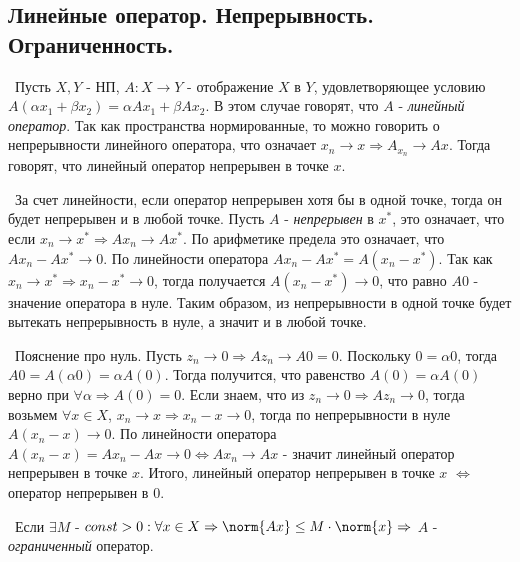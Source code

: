 \subsection*{Линейные оператор. Непрерывность. Ограниченность.}

\noindent\textasteriskcentered~Пусть $X, Y$ - НП, $A : X \rightarrow Y$ - отображение $X$ в $Y$, удовлетворяющее условию $A(\alpha x_1 + \beta x_2) = \alpha A x_1 + 
\beta A x_2$.  В этом случае говорят, что $A$ - \textit{линейный оператор}. Так как пространства нормированные, то можно говорить о непрерывности линейного оператора, 
что означает $x_n \to x \Rightarrow A_{x_n} \to A x$. Тогда говорят, что линейный оператор непрерывен в точке $x$. 

\smallskip
\noindent\textbullet~За счет линейности, если оператор непрерывен хотя бы в
одной точке, тогда он будет непрерывен и в любой точке. Пусть $A$ - \textit{непрерывен} в $x^*$, это означает, что если $x_n \to x^* \Rightarrow A x_n \to A x^*$. По арифметике
предела это означает, что $A x_n - A x^* \to 0$. По линейности оператора $A x_n - A x^* = A(x_n - x^*)$. Так как $x_n \to x^* \Rightarrow 
x_n - x^* \to 0$, тогда получается $A(x_n - x^*) \to 0$, что равно $A 0$ - значение оператора в нуле. Таким образом, из непрерывности в одной точке будет вытекать
непрерывность в нуле, а значит и в любой точке. 

\smallskip
\noindent\textbullet~Пояснение про нуль. Пусть $z_n \to 0 \Rightarrow A z_n \to A 0 = 0$. 
Поскольку $0 = \alpha 0$, тогда $A 0 = A(\alpha 0) = \alpha A(0)$. Тогда получится, что равенство $A(0) = \alpha A(0)$ верно при $\forall \alpha \Rightarrow A(0) = 0$.
Если знаем, что из $z_n \to 0 \Rightarrow A z_n \to 0$, тогда возьмем $\forall x \in X$, $x_n \to x \Rightarrow x_n - x \to 0$, тогда по непрерывности в нуле $A(x_n - x) \to 0$. По
линейности оператора $A(x_n - x) = A x_n - A x \to 0 \Longleftrightarrow A x_n \to Ax$ - значит линейный оператор непрерывен в точке $x$. Итого, линейный оператор
непрерывен в точке $x$ $\Longleftrightarrow$ оператор непрерывен в $0$.

\smallskip
\noindent\textasteriskcentered~Если $\exists M$ - $const > 0 : \forall x \in X \Rightarrow \norm{Ax} \le M \cdot \norm{x} \Rightarrow$ $A$ - \textit{ограниченный} оператор. 

